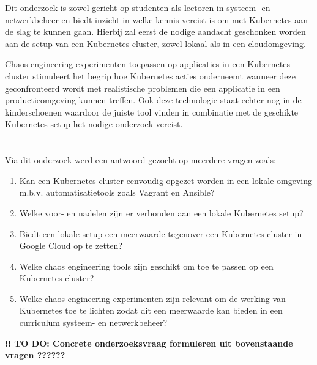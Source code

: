 Dit onderzoek is zowel gericht op studenten als lectoren in systeem- en netwerkbeheer en biedt inzicht in welke kennis vereist is om met Kubernetes aan de slag te kunnen gaan. Hierbij zal eerst de nodige aandacht geschonken worden aan de setup van een Kubernetes cluster, zowel lokaal als in een cloudomgeving. 

Chaos engineering experimenten toepassen op applicaties in een Kubernetes cluster stimuleert het begrip hoe Kubernetes acties onderneemt wanneer deze geconfronteerd wordt met realistische problemen die een applicatie in een productieomgeving kunnen treffen. Ook deze technologie staat echter nog in de kinderschoenen waardoor de juiste tool vinden in combinatie met de geschikte Kubernetes setup het nodige onderzoek vereist. 

\section{}
\label{sec:onderzoeksvraag}

Via dit onderzoek werd een antwoord gezocht op meerdere vragen zoals:  
\begin{enumerate}
    \item Kan een Kubernetes cluster eenvoudig opgezet worden in een lokale omgeving m.b.v. automatisatietools zoals Vagrant en Ansible?
    \item Welke voor- en nadelen zijn er verbonden aan een lokale Kubernetes setup? 
    \item Biedt een lokale setup een meerwaarde tegenover een Kubernetes cluster in Google Cloud op te zetten? 
    \item Welke chaos engineering tools zijn geschikt om toe te passen op een Kubernetes cluster? 
    \item Welke chaos engineering experimenten zijn relevant om de werking van Kubernetes toe te lichten zodat dit een meerwaarde kan bieden in een curriculum systeem- en netwerkbeheer? 
\end{enumerate} 

{\bf !! TO DO: Concrete onderzoeksvraag formuleren uit bovenstaande vragen ?????? }

\section{}
\label{sec:onderzoeksdoelstelling}

